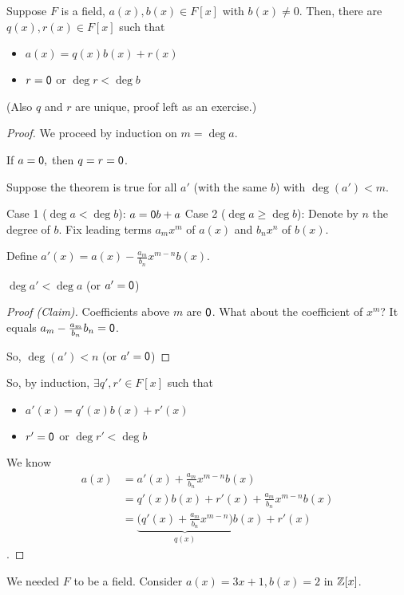 \documentclass[notes.tex]{subfiles}
\begin{document}
\begin{theorem}
	\label{thm:polydivalg}
	Suppose $F$ is a field, $a(x), b(x)\in F[x]$ with $b(x)\ne 0$. Then, there are $q(x), r(x) \in F[x]$ such that
	\begin{itemize}
		\item $a(x) = q(x)b(x) + r(x)$
		\item $r = \mathsf{0}$ or $\deg r < \deg b$
	\end{itemize}
	(Also $q$ and $r$ are unique, proof left as an exercise.)
\end{theorem}
\begin{proof}
	We proceed by induction on $m = \deg a$. 

	If $a=\mathsf{0},$ then $q=r=\mathsf{0}$.

	Suppose the theorem is true for all $a'$ (with the same $b$) with $\deg(a') < m$.

	Case 1 ($\deg a < \deg b$):
	\tabin
		$a = \mathsf{0} b + a$ 
	\tabout
	Case 2 ($\deg a \ge \deg b$):
	\tabin
		Denote by $n$ the degree of $b$.
		Fix leading terms $a_mx^m$ of $a(x)$ and $b_nx^n$ of $b(x)$.

		Define $a'(x) = a(x) - \frac{a_m}{b_n}x^{m-n}b(x)$.

		\begin{claim}
			$\deg a' < \deg a$
			(or $a'=\mathsf{0}$)
		\end{claim}
		\begin{proof}[Proof (Claim)]
			Coefficients above $m$ are $\mathsf{0}$. What about the coefficient of $x^m$? It equals $a_m - \frac{a_m}{b_n}b_n = \mathsf{0}$.

			So, $\deg(a') < n$ (or $a' = \mathsf{0}$)
		\end{proof}
		So, by induction, $\exists q', r'\in F[x]$ such that
		\begin{itemize}
			\item $a'(x) = q'(x)b(x) + r'(x)$
			\item $r'=\mathsf{0}$ or $\deg r' < \deg b$
		\end{itemize}
		We know \begin{align*}
			a(x)&=a'(x) + \frac{a_m}{b_n}x^{m-n}b(x)\\
			&= q'(x)b(x) + r'(x) + \frac{a_m}{b_n}x^{m-n}b(x)\\
			&= \underbrace{\big(q'(x) + \frac{a_m}{b_n}x^{m-n}\big)}_{q(x)}b(x) + r'(x)
		\end{align*}.
	\tabout
\end{proof}

We needed $F$ to be a field. Consider $a(x) = 3x+1, b(x) = 2$ in $\mathbb{Z}[x]$.
\end{document}
